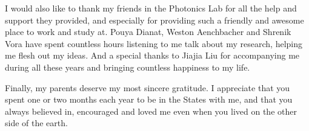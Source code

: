 \begin{preamble}
\begin{acknowledgments}
I would also like to thank my friends in the Photonics Lab for all the help and
support they provided, and especially for providing such a friendly and awesome
place to work and study at. Pouya Dianat, Weston Aenchbacher and Shrenik Vora
have spent countless hours listening to me talk about my research, helping me
flesh out my ideas. And a special thanks to Jiajia Liu for accompanying me
during all these years and bringing countless happiness to my life.

Finally, my parents deserve my most sincere gratitude. I appreciate that you
spent one or two months each year to be in the States with me, and that you
always believed in, encouraged and loved me even when you lived on the other
side of the earth.

\end{acknowledgments}

\iffinal{}{\newpage}

\tableofcontents 
\iffinal{}{\newpage}

\listoftables
\iffinal{}{\newpage}

\listoffigures 
\iffinal{}{\newpage}

\begin{abstract}


\end{abstract}
\end{preamble}
